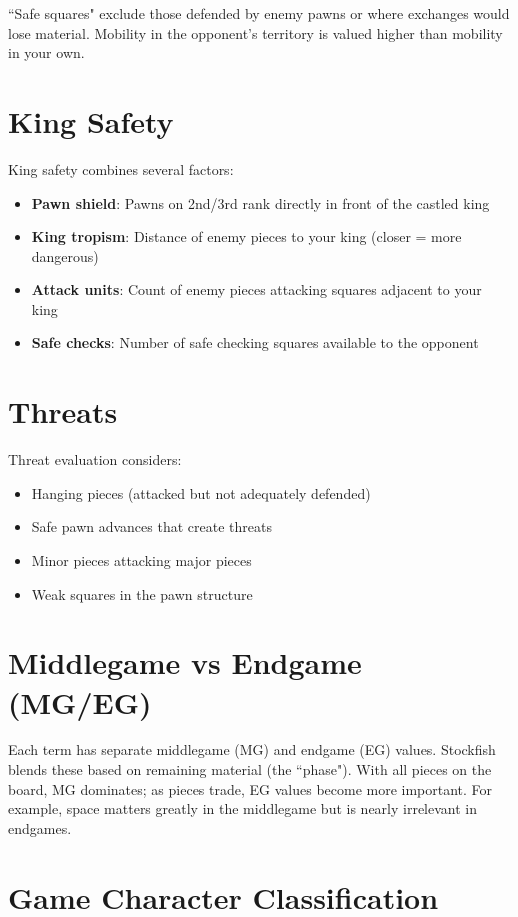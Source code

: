 \documentclass[11pt]{book}
\begin{document}
``Safe squares" exclude those defended by enemy pawns or where exchanges would lose material. Mobility in the opponent's territory is valued higher than mobility in your own.

\section{King Safety}

King safety combines several factors:
\begin{itemize}
\item \textbf{Pawn shield}: Pawns on 2nd/3rd rank directly in front of the castled king
\item \textbf{King tropism}: Distance of enemy pieces to your king (closer = more dangerous)
\item \textbf{Attack units}: Count of enemy pieces attacking squares adjacent to your king
\item \textbf{Safe checks}: Number of safe checking squares available to the opponent
\end{itemize}

\section{Threats}

Threat evaluation considers:
\begin{itemize}
\item Hanging pieces (attacked but not adequately defended)
\item Safe pawn advances that create threats
\item Minor pieces attacking major pieces
\item Weak squares in the pawn structure
\end{itemize}

\section{Middlegame vs Endgame (MG/EG)}

Each term has separate middlegame (MG) and endgame (EG) values. Stockfish blends these based on remaining material (the ``phase"). With all pieces on the board, MG dominates; as pieces trade, EG values become more important. For example, space matters greatly in the middlegame but is nearly irrelevant in endgames.

\section{Game Character Classification}
\end{document}
